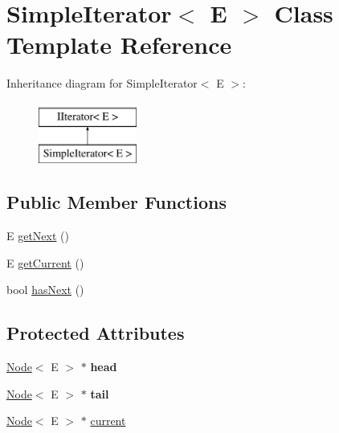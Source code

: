 \hypertarget{classSimpleIterator}{\section{Simple\-Iterator$<$ E $>$ Class Template Reference}
\label{classSimpleIterator}
}
Inheritance diagram for Simple\-Iterator$<$ E $>$\-:\begin{figure}[H]
\begin{center}
\leavevmode
\includegraphics[height=2.000000cm]{classSimpleIterator}
\end{center}
\end{figure}
\subsection*{Public Member Functions}
\begin{DoxyCompactItemize}
\item 
E \hyperlink{classSimpleIterator_ab01032dba9ff4f1a1c47af3082b717d5}{get\-Next} ()
\item 
E \hyperlink{classSimpleIterator_ada16d38e21da7f42c32aa9680be81a75}{get\-Current} ()
\item 
bool \hyperlink{classSimpleIterator_a3d25dee31165c800b80d53a09596fb29}{has\-Next} ()
\end{DoxyCompactItemize}
\subsection*{Protected Attributes}
\begin{DoxyCompactItemize}
\item 
\hypertarget{classSimpleIterator_a0403100ab86dba958115cea4147508a7}{\hyperlink{classNode}{Node}$<$ E $>$ $\ast$ {\bfseries head}}\label{classSimpleIterator_a0403100ab86dba958115cea4147508a7}

\item 
\hypertarget{classSimpleIterator_a9bfb7d6c12bc1e8031b5c0869026415a}{\hyperlink{classNode}{Node}$<$ E $>$ $\ast$ {\bfseries tail}}\label{classSimpleIterator_a9bfb7d6c12bc1e8031b5c0869026415a}

\item 
\hyperlink{classNode}{Node}$<$ E $>$ $\ast$ \hyperlink{classSimpleIterator_a7777fefe265a5067ec9319d8c1a3e278}{current}
\end{DoxyCompactItemize}

